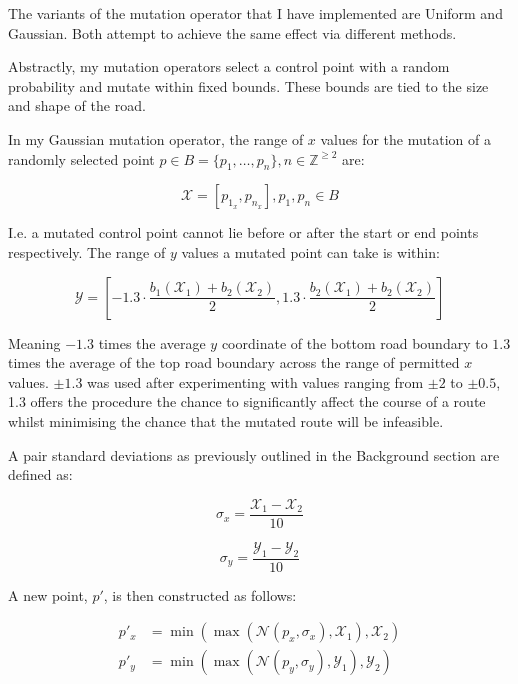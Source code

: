 The variants of the mutation operator that I have implemented are Uniform and Gaussian. Both attempt to achieve the same effect via different methods.

Abstractly, my mutation operators select a control point with a random probability and mutate within fixed bounds. These bounds are tied to the size and shape of the road.

In my Gaussian mutation operator, the range of $x$ values for the mutation of a randomly selected point $ p \in B = \{ p_{1}, \ldots, p_{n} \}, n\in \mathbb{Z}^{\geq 2 }$ are:

\begin{equation}
\mathcal{X} = \left[p_{1_{x}}, p_{n_{x}}\right], p_{1}, p_{n} \in B
\end{equation}

I.e. a mutated control point cannot lie before or after the start or end points respectively. The range of $y$ values a mutated point can take is within:

\begin{equation}
  \mathcal{Y} = \left[ - 1.3 \cdot \frac{b_{1}(\mathcal{X}_{1}) + b_{2}(\mathcal{X}_{2})}{2}, 1.3 \cdot \frac{b_{2}(\mathcal{X}_{1}) + b_{2}(\mathcal{X}_{2})}{2} \right]
\end{equation}

Meaning $-1.3$ times the average $y$ coordinate of the bottom road boundary to $1.3$ times the average of the top road boundary across the range of permitted $x$ values. $\pm 1.3$ was used after experimenting with values ranging from $\pm 2$ to $\pm 0.5$, 1.3 offers the procedure the chance to significantly affect the course of a route whilst minimising the chance that the mutated route will be infeasible.

A pair standard deviations as previously outlined in the Background section are defined as:

\begin{equation}
\sigma_{x} = \frac{\mathcal{X}_{1}-\mathcal{X}_{2}}{10}
\end{equation}

\begin{equation}
\sigma_{y} = \frac{\mathcal{Y}_{1}-\mathcal{Y}_{2}}{10}
\end{equation}

A new point, $p'$, is then constructed as follows:

\begin{align}
  p'_{x}  &= \min(\max(\mathcal{N}(p_{x},\sigma_{x}),\mathcal{X}_{1}),\mathcal{X}_{2})\\
  p'_{y}  &= \min(\max(\mathcal{N}(p_{y},\sigma_{y}),\mathcal{Y}_{1}),\mathcal{Y}_{2})
\end{align}

